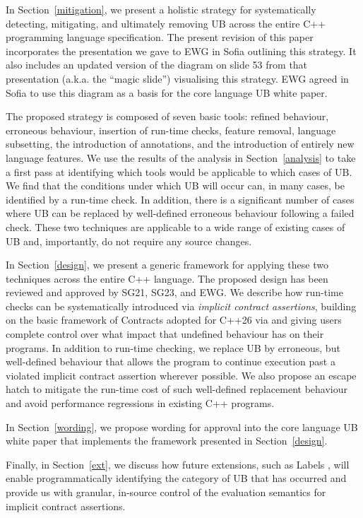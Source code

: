 In Section~\ref{mitigation}, we present a holistic strategy for systematically detecting, mitigating, and ultimately removing UB across the entire C++ programming language specification. The present revision of this paper incorporates the presentation \cite{P3754R0} we gave to EWG in Sofia outlining this strategy. It also includes an updated version of the diagram on slide 53 from that presentation (a.k.a. the ``magic slide'') visualising this strategy. EWG agreed in Sofia to use this diagram as a basis for the core language UB white paper.

The proposed strategy is composed of seven basic tools: refined behaviour, erroneous behaviour, insertion of run-time checks, feature removal, language subsetting, the introduction of annotations, and the introduction of entirely new language features. We use the results of the analysis in Section~\ref{analysis} to take a first pass at identifying which tools would be applicable to which cases of UB. We find that the conditions under which UB will occur can, in many cases, be identified by a run-time check. In addition, there is a significant number of cases where UB can be replaced by well-defined erroneous behaviour following a failed check. These two techniques are applicable to a wide range of existing cases of UB and, importantly, do not require any source changes.

In Section~\ref{design}, we present a generic framework for applying these two techniques across the entire C++ language. The proposed design has been reviewed and approved by SG21, SG23, and EWG. We describe how run-time checks can be systematically introduced via \emph{implicit contract assertions}, building on the basic framework of Contracts adopted for C++26 via \cite{P2900R14} and giving users complete control over what impact that undefined behaviour has on their programs. In addition to run-time checking, we replace UB by erroneous, but well-defined behaviour that allows the program to continue execution past a violated implicit contract assertion wherever possible. We also propose an escape hatch to mitigate the run-time cost of such well-defined replacement behaviour and avoid performance regressions in existing C++ programs.

In Section~\ref{wording}, we propose wording for approval into the core language UB white paper \cite{P3656R1} that implements the framework presented in Section~\ref{design}.

Finally, in Section~\ref{ext}, we discuss how future extensions, such as Labels \cite{P3400R1},
will enable programmatically identifying the category of UB that has occurred and provide us with granular, in-source control of the evaluation semantics for implicit contract assertions.

